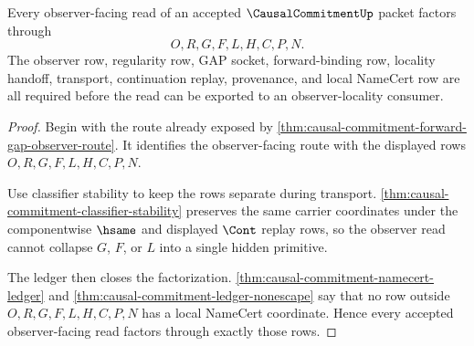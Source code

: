 \begin{theorem}
\label{thm:causal-commitment-observer-row-factorization}
Every observer-facing read of an accepted $\CausalCommitmentUp$ packet factors
through
$$
O,R,G,F,L,H,C,P,N.
$$
The observer row, regularity row, GAP socket, forward-binding row, locality
handoff, transport, continuation replay, provenance, and local NameCert row
are all required before the read can be exported to an observer-locality
consumer.
\end{theorem}
\begin{proof}
Begin with the route already exposed by
\autoref{thm:causal-commitment-forward-gap-observer-route}. It identifies the
observer-facing route with the displayed rows $O,R,G,F,L,H,C,P,N$.

Use classifier stability to keep the rows separate during transport.
\autoref{thm:causal-commitment-classifier-stability} preserves the same
carrier coordinates under the componentwise $\hsame$ and displayed $\Cont$
replay rows, so the observer read cannot collapse $G$, $F$, or $L$ into a
single hidden primitive.

The ledger then closes the factorization.
\autoref{thm:causal-commitment-namecert-ledger} and
\autoref{thm:causal-commitment-ledger-nonescape} say that no row outside
$O,R,G,F,L,H,C,P,N$ has a local NameCert coordinate. Hence every accepted
observer-facing read factors through exactly those rows.
\end{proof}

